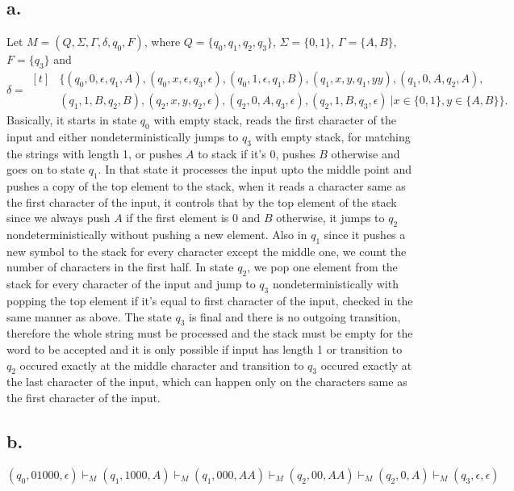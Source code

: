 \documentclass[12pt]{article}
\begin{document}
\subsection*{a.}
Let $M=(Q, \Sigma, \Gamma, \delta, q_0, F)$, where $Q=\{q_0,q_1,q_2,q_3\}$, $\Sigma =\{0,1\}$,
$\Gamma =\{A,B\}$, $F=\{q_3\}$ and $\delta =
\begin{aligned}[t]
	& \{(q_0, 0, \epsilon, q_1, A), (q_0, x, \epsilon, q_3, \epsilon), (q_0, 1, \epsilon, q_1, B),
	(q_1, x, y, q_1, yy), (q_1, 0, A, q_2, A), \\ 
	& (q_1, 1, B, q_2, B), (q_2, x, y, q_2, \epsilon),
	(q_2, 0, A, q_3, \epsilon), (q_2, 1, B, q_3, \epsilon)\ | x\in \{0,1\}, y\in \{A,B\}\}.
\end{aligned} $
\\
Basically, it starts in state $q_0$ with empty stack, reads the first character of the input
and either nondeterministically jumps to $q_3$ with empty stack, for matching the strings with
length 1, or pushes $A$ to stack if it's $0$, pushes $B$ otherwise and goes on to state $q_1$. 
In that state it processes the input upto the middle point and pushes a copy of the top element 
to the stack, when it reads a character same as the first character of the input, it controls
that by the top element of the stack since we always push $A$ if the first element is $0$
and $B$ otherwise, it jumps to $q_2$ nondeterministically without pushing a new element.
Also in $q_1$ since it pushes a new symbol to the stack for every character except the middle
one, we count the number of characters in the first half. In state $q_2$, we pop one element
from the stack for every character of the input and jump to $q_3$ nondeterministically with
popping the top element if it's equal to first character of the input, checked in the same 
manner as above. The state $q_3$ is final and there is no outgoing transition, therefore
the whole string must be processed and the stack must be empty for the word to be accepted
and it is only possible if input has length 1 or transition to $q_2$ occured exactly at 
the middle character and transition to $q_3$ occured exactly at the last character of the 
input, which can happen only on the characters same as the first character of the input.

\subsection*{b.}
$(q_0, 01000, \epsilon )\vdash_M (q_1, 1000, A)\vdash_M (q_1, 000, AA)\vdash_M (q_2, 00, AA)\vdash_M
(q_2, 0, A)\vdash_M (q_3, \epsilon, \epsilon)$
\end{document}
